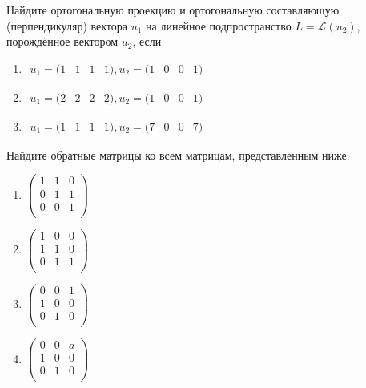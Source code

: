 \documentclass[pdftex,11pt,openany]{book}\usepackage[]{graphicx}\usepackage[]{color}
\begin{document}
\begin{problem}
Найдите ортогональную проекцию и ортогональную составляющую (перпендикуляр) вектора $u_1$ на линейное подпространство $L = \mathcal{L}(u_2)$, порождённое вектором $u_2$, если
\begin{enumerate}
\item $\begin{matrix} u_1 = (1 & 1 & 1 & 1), u_2 = (1 & 0 & 0 & 1) \end{matrix}$
\item $\begin{matrix} u_1 = (2 & 2 & 2 & 2), u_2 = (1 & 0 & 0 & 1) \end{matrix}$
\item $\begin{matrix} u_1 = (1 & 1 & 1 & 1), u_2 = (7 & 0 & 0 & 7) \end{matrix}$
\end{enumerate}
\end{problem}

\begin{solution}
\end{solution}


\begin{problem}
Найдите обратные матрицы ко всем матрицам, представленным ниже.
\begin{enumerate}
\item
\ensuremath{%
\begin{pmatrix}{}
    1 &   1 &   0 \\ 
    0 &   1 &   1 \\ 
    0 &   0 &   1 \\ 
  \end{pmatrix}
}
\item
\ensuremath{%
\begin{pmatrix}{}
    1 &   0 &   0 \\ 
    1 &   1 &   0 \\ 
    0 &   1 &   1 \\ 
  \end{pmatrix}
}
\item
\ensuremath{%
\begin{pmatrix}{}
    0 &   0 &   1 \\ 
    1 &   0 &   0 \\ 
    0 &   1 &   0 \\ 
  \end{pmatrix}
}
\item
\ensuremath{%
\begin{pmatrix}{}
  0 & 0 & a \\ 
  1 & 0 & 0 \\ 
  0 & 1 & 0 \\ 
  \end{pmatrix}
}
\end{enumerate}
\end{problem}
\end{document}
